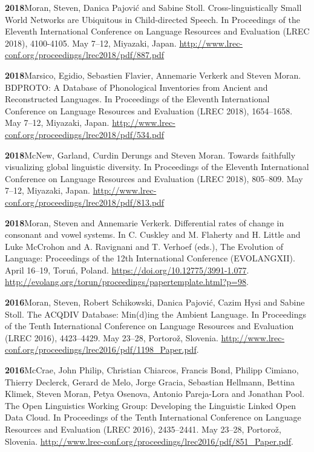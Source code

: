 \documentclass[11pt]{article}
\newcommand{\hangpara}{
 \setlength{\parindent}{0in} %
 \hangindent=0.42in %
}
\begin{document}
\vskip 6pt
\hangpara
{\bf 2018}\hspace{1ex}Moran, Steven, Danica Pajovi{\'c} and Sabine Stoll. Cross-linguistically Small World Networks are Ubiquitous in Child-directed Speech. In Proceedings of the Eleventh International Conference on Language Resources and Evaluation (LREC 2018), 4100-4105. May 7--12, Miyazaki, Japan.  \url{http://www.lrec-conf.org/proceedings/lrec2018/pdf/887.pdf}

\vskip 6pt
\hangpara
{\bf 2018}\hspace{1ex}Marsico, Egidio, Sebastien Flavier, Annemarie Verkerk and Steven Moran. BDPROTO: A Database of Phonological Inventories from Ancient and Reconstructed Languages. In Proceedings of the Eleventh International Conference on Language Resources and Evaluation (LREC 2018), 1654--1658. May 7--12, Miyazaki, Japan. \url{http://www.lrec-conf.org/proceedings/lrec2018/pdf/534.pdf}

\vskip 6pt
\hangpara
{\bf 2018}\hspace{1ex}McNew, Garland, Curdin Derungs and Steven Moran. Towards faithfully visualizing global linguistic diversity. In Proceedings of the Eleventh International Conference on Language Resources and Evaluation (LREC 2018), 805--809. May 7--12, Miyazaki, Japan. \url{http://www.lrec-conf.org/proceedings/lrec2018/pdf/813.pdf}

\vskip 6pt
\hangpara
{\bf 2018}\hspace{1ex}Moran, Steven and Annemarie Verkerk. Differential rates of change in consonant and vowel systems. In C. Cuskley and M. Flaherty and H. Little and Luke McCrohon and A. Ravignani and T. Verhoef (eds.), The Evolution of Language: Proceedings of the 12th International Conference (EVOLANGXII). April 16--19, Toru{\'n}, Poland. \url{https://doi.org/10.12775/3991-1.077}. \url{http://evolang.org/torun/proceedings/papertemplate.html?p=98}.

\vskip 6pt
\hangpara
{\bf 2016}\hspace{1ex}Moran, Steven, Robert Schikowski, Danica Pajovi{\'c}, Cazim Hysi and Sabine Stoll. The ACQDIV Database: Min(d)ing the Ambient Language. In Proceedings of the Tenth International Conference on Language Resources and Evaluation (LREC 2016), 4423--4429. May 23--28, Portoro{\v z}, Slovenia. \url{http://www.lrec-conf.org/proceedings/lrec2016/pdf/1198\_Paper.pdf}.

\vskip 6pt
\hangpara
{\bf 2016}\hspace{1ex}McCrae, John Philip, Christian Chiarcos, Francis Bond, Philipp Cimiano, Thierry Declerck, Gerard de Melo, Jorge Gracia, Sebastian Hellmann, Bettina Klimek, Steven Moran, Petya Osenova, Antonio Pareja-Lora and Jonathan Pool. The Open Linguistics Working Group: Developing the Linguistic Linked Open Data Cloud. In Proceedings of the Tenth International Conference on Language Resources and Evaluation (LREC 2016), 2435--2441. May 23--28, Portoro{\v z}, Slovenia. \url{http://www.lrec-conf.org/proceedings/lrec2016/pdf/851\_Paper.pdf}.
\end{document}
